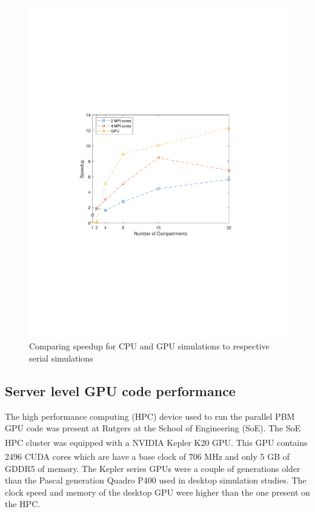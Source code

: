 \documentclass[review]{elsarticle}
\begin{document}
\begin{linenumbers}
\begin{figure}[H]
\centering
\includegraphics[scale=0.7,trim=120 240 120 240, clip]{Figure_7.pdf}
\caption{Comparing speedup for CPU and GPU simulations to respective serial simulations}
\label{fig:res_desktop_speedup}
\end{figure}



\subsection{Server level GPU code performance}
The high performance computing (HPC) device used to run the parallel PBM GPU code 
was present at Rutgers at the School of Engineering (SoE). The SoE HPC cluster was 
equipped with a NVIDIA\textsuperscript{\tiny\textregistered} Kepler K20 GPU. This GPU contains 2496 CUDA\textsuperscript{\tiny\textregistered} cores which are 
have a base clock of $706$ MHz and only 5 GB of GDDR5 of memory. The Kepler series 
GPUs were a couple of generations older than the Pascal generation Quadro P400 used 
in desktop simulation studies. The clock speed and memory of the desktop GPU were 
higher than the one present on the HPC. 


\end{linenumbers}
\end{document}
